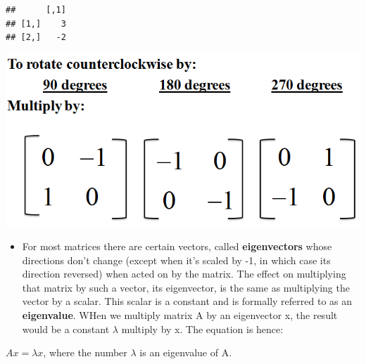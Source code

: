 \documentclass[]{article}
\providecommand{\tightlist}{%
  \setlength{\itemsep}{0pt}\setlength{\parskip}{0pt}}
\begin{document}
\begin{verbatim}
##      [,1]
## [1,]    3
## [2,]   -2
\end{verbatim}

\includegraphics{assets/rotation.gif}

\begin{itemize}
\tightlist
\item
  For most matrices there are certain vectors, called
  \textbf{eigenvectors} whose directions don't change (except when it's
  scaled by -1, in which case its direction reversed) when acted on by
  the matrix. The effect on multiplying that matrix by such a vector,
  its eigenvector, is the same as multiplying the vector by a scalar.
  This scalar is a constant and is formally referred to as an
  \textbf{eigenvalue}. WHen we multiply matrix A by an eigenvector x,
  the result would be a constant \(\lambda\) multiply by x. The equation
  is hence:
\end{itemize}

\(Ax = \lambda x\), where the number \(\lambda\) is an eigenvalue of A.
\end{document}
